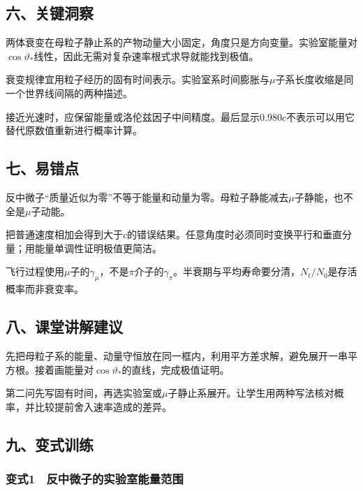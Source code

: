 \documentclass[12pt,a4paper,fontset=fandol]{ctexart}
\begin{document}
\subsection{六、关键洞察}\label{ux516dux5173ux952eux6d1eux5bdf-5}

两体衰变在母粒子静止系的产物动量大小固定，角度只是方向变量。实验室能量对\(\cos\vartheta_*\)线性，因此无需对复杂速率根式求导就能找到极值。

衰变规律宜用粒子经历的固有时间表示。实验室系时间膨胀与\(\mu\)子系长度收缩是同一个世界线间隔的两种描述。

接近光速时，应保留能量或洛伦兹因子中间精度。最后显示\(0.980c\)不表示可以用它替代原数值重新进行概率计算。

\subsection{七、易错点}\label{ux4e03ux6613ux9519ux70b9-5}

反中微子``质量近似为零''不等于能量和动量为零。母粒子静能减去\(\mu\)子静能，也不全是\(\mu\)子动能。

把普通速度相加会得到大于\(c\)的错误结果。任意角度时必须同时变换平行和垂直分量；用能量单调性证明极值更简洁。

飞行过程使用\(\mu\)子的\(\gamma_\mu\)，不是\(\pi\)介子的\(\gamma_\pi\)。半衰期与平均寿命要分清，\(N_t/N_0\)是存活概率而非衰变率。

\subsection{八、课堂讲解建议}\label{ux516bux8bfeux5802ux8bb2ux89e3ux5efaux8bae-5}

先把母粒子系的能量、动量守恒放在同一框内，利用平方差求解，避免展开一串平方根。接着画能量对\(\cos\vartheta_*\)的直线，完成极值证明。

第二问先写固有时间，再选实验室或\(\mu\)子静止系展开。让学生用两种写法核对概率，并比较提前舍入速率造成的差异。

\subsection{九、变式训练}\label{ux4e5dux53d8ux5f0fux8badux7ec3-5}

\subsubsection{变式1　反中微子的实验室能量范围}\label{ux53d8ux5f0f1-ux53cdux4e2dux5faeux5b50ux7684ux5b9eux9a8cux5ba4ux80fdux91cfux8303ux56f4}
\end{document}
